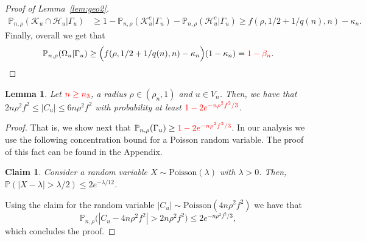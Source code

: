 \documentclass[letterpaper,11pt]{article}
\newcommand{\PP}{\mathbb{P}}
\newcommand{\calH}{\mathcal{H}}
\newcommand{\calF}{\mathcal{F}}
\newcommand{\nsf}{\mathsf{N}}
\newtheorem{lemma}{Lemma}
\newtheorem{claim}{Claim}
\begin{document}
\begin{proof}[Proof of Lemma~\ref{lem:geo2}]
\begin{align*}
\PP_{n,\rho}(\mathcal{K}_u\cap \calH_u|\Gamma_u)&\ge 1-\PP_{n,\rho}(\mathcal{K}^c_u|\Gamma_u)-\PP_{n,\rho}(\mathcal{H}^c_u|\Gamma_u)\ge f(\rho,1/2+1/q(n),n)-\kappa_n.
\end{align*}
Finally, overall we get that 
\begin{equation*}
\PP_{n,\rho}(\Omega_u|\Gamma_u)\ge \Big(f(\rho,1/2+1/q(n),n)-\kappa_n\Big)(1-\kappa_n)={\color{red} 1-\beta_n}.\qedhere
\end{equation*}
\end{proof}

\begin{lemma}
\label{lem:geo3}
Let $\color{red} n\ge n_3$, a radius $\rho\in (\rho_n,1)$ and $u\in V_n$.
Then, we have that $2n\rho^2f^2\le |C_u|\le 6n\rho^2f^2$ with probability at least ${\color{red}1-2e^{-n\rho^2f^2/3}}$.
\end{lemma}

\begin{proof}
That is, we show next that $\PP_{n,\rho}(\Gamma_u)\ge {\color{red}1-2e^{-n\rho^2f^2/3}}$.
In our analysis we use the following concentration bound for a Poisson random variable. 
The proof of this fact can be found in the Appendix.
\begin{claim}
\label{claim:concentration-poisson}
Consider a random variable $X\sim \text{Poisson}(\lambda)$ with $\lambda>0$.
Then, $\PP(|X-\lambda|>\lambda/2)\le 2e^{-\lambda/12}$.
\end{claim}
\noindent Using the claim for the random variable $|C_u|\sim \text{Poisson}(4n\rho^2f^2)$ we have that 
\begin{equation*}\PP_{n,\rho}\Big(|C_u-4n\rho^2f^2|>2n\rho^2f^2\Big)\le 2e^{-n\rho^2f^2/3},\end{equation*}
which concludes the proof.
\end{proof}
\end{document}

